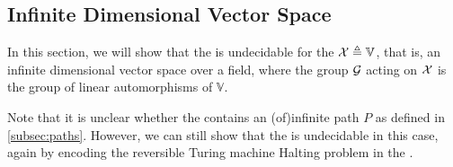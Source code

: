 


\subsection{Infinite Dimensional Vector Space}
\label{subsec:vector}

\AP
In this section, we will show that the  is undecidable for the 
$\mathcal{X} \triangleq \mathbb{V}$, that is, an infinite dimensional vector space
over a field, where the group $\mathcal{G}$ acting on $\mathcal{X}$ is the group of
linear automorphisms of $\mathbb{V}$.

Note that it is unclear whether the 
contains an \kl(of){infinite path} $P$ as defined in
\cref{subsec:paths}. However, we can
still show that the  is undecidable in
this case, again by encoding the reversible Turing machine Halting problem in
the .




